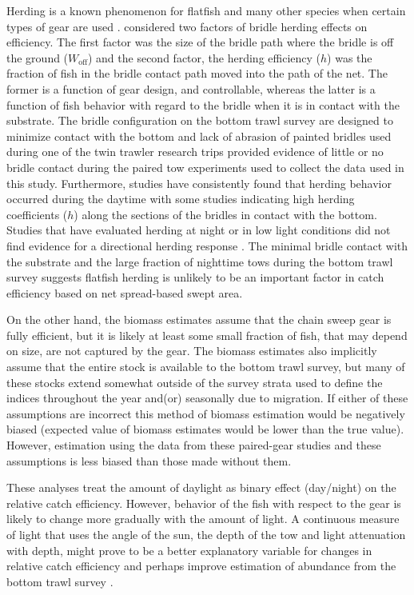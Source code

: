\documentclass[
  12pt,
]{article}
\begin{document}
Herding is a known phenomenon for flatfish and many other species when
certain types of gear are used
\citep{rammxiao95,somertonmunro01,somertonetal07,roseetal10}.
\citet{somertonmunro01} considered two factors of bridle herding effects
on efficiency. The first factor was the size of the bridle path where
the bridle is off the ground (\(W_\text{off}\)) and the second factor,
the herding efficiency (\(h\)) was the fraction of fish in the bridle
contact path moved into the path of the net. The former is a function of
gear design, and controllable, whereas the latter is a function of fish
behavior with regard to the bridle when it is in contact with the
substrate. The bridle configuration on the bottom trawl survey are
designed to minimize contact with the bottom and lack of abrasion of
painted bridles used during one of the twin trawler research trips
provided evidence of little or no bridle contact during the paired tow
experiments used to collect the data used in this study. Furthermore,
studies have consistently found that herding behavior occurred during
the daytime
\citep{glasswardle89,somertonmunro01,ryerbarnett06,bryanetal14,ryeretal10,deanetal21}
with some studies indicating high herding coefficients (\(h\)) along the
sections of the bridles in contact with the bottom. Studies that have
evaluated herding at night or in low light conditions did not find
evidence for a directional herding response
\citep{glasswardle89,ryerbarnett06,ryer08,ryeretal10}. The minimal
bridle contact with the substrate and the large fraction of nighttime
tows during the bottom trawl survey suggests flatfish herding is
unlikely to be an important factor in catch efficiency based on net
spread-based swept area.

On the other hand, the biomass estimates assume that the chain sweep
gear is fully efficient, but it is likely at least some small fraction
of fish, that may depend on size, are not captured by the gear. The
biomass estimates also implicitly assume that the entire stock is
available to the bottom trawl survey, but many of these stocks extend
somewhat outside of the survey strata used to define the indices
throughout the year and(or) seasonally due to migration. If either of
these assumptions are incorrect this method of biomass estimation would
be negatively biased (expected value of biomass estimates would be lower
than the true value). However, estimation using the data from these
paired-gear studies and these assumptions is less biased than those made
without them.

These analyses treat the amount of daylight as binary effect (day/night)
on the relative catch efficiency. However, behavior of the fish with
respect to the gear is likely to change more gradually with the amount
of light. A continuous measure of light that uses the angle of the sun,
the depth of the tow and light attenuation with depth, might prove to be
a better explanatory variable for changes in relative catch efficiency
and perhaps improve estimation of abundance from the bottom trawl survey
\citep{jacobsonetal15,kaingeetal17}.
\end{document}
